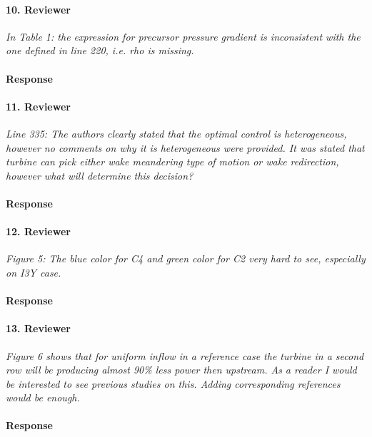 \documentclass[]{article}
\begin{document}
\hrulefill

\paragraph{10. Reviewer} \textit{In Table 1: the expression for precursor pressure gradient is inconsistent with the one defined in line 220, i.e. rho is missing.}

\paragraph{Response} 

\hrulefill

\paragraph{11. Reviewer} \textit{Line 335: The authors clearly stated that the optimal control is heterogeneous, however no comments on why it is heterogeneous were provided. It was stated that turbine can pick either wake meandering type of motion or wake redirection, however what will determine this decision?}

\paragraph{Response} 

\hrulefill

\paragraph{12. Reviewer} \textit{Figure 5: The blue color for C4 and green color for C2 very hard to see, especially on I3Y case.}

\paragraph{Response} 

\hrulefill

\paragraph{13. Reviewer} \textit{Figure 6 shows that for uniform inflow in a reference case the turbine in a second row will be producing almost 90\% less power then upstream. As a reader I would be interested to see previous studies on this. Adding corresponding references would be enough.}

\paragraph{Response} 
\end{document}
